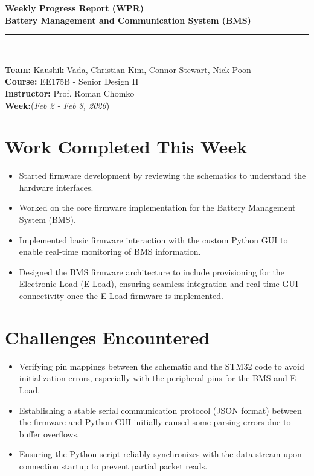 \documentclass[12pt]{article}
\begin{document}
\begin{center}
    {\Large \textbf{Weekly Progress Report (WPR)}} \\[6pt]
    {\large \textbf{Battery Management and Communication System (BMS)}} \\[2pt]
    \rule{0.8\textwidth}{0.5pt} \\[6pt]
\end{center}

\noindent
\textbf{Team:} Kaushik Vada, Christian Kim, Connor Stewart, Nick Poon \\[3pt]
\textbf{Course:} EE175B - Senior Design II \\
\textbf{Instructor:} Prof. Roman Chomko \\
\textbf{Week:}(\textit{Feb 2 - Feb 8, 2026}) \\[8pt]

\vspace{1em}

\section{Work Completed This Week}
\begin{itemize}[leftmargin=1cm]
    \item Started firmware development by reviewing the schematics to understand the hardware interfaces.
    \item Worked on the core firmware implementation for the Battery Management System (BMS).
    \item Implemented basic firmware interaction with the custom Python GUI to enable real-time monitoring of BMS information.
    \item Designed the BMS firmware architecture to include provisioning for the Electronic Load (E-Load), ensuring seamless integration and real-time GUI connectivity once the E-Load firmware is implemented.
\end{itemize}

\vspace{1em}

\section{Challenges Encountered}
\begin{itemize}[leftmargin=1cm]
    \item Verifying pin mappings between the schematic and the STM32 code to avoid initialization errors, especially with the peripheral pins for the BMS and E-Load.
    \item Establishing a stable serial communication protocol (JSON format) between the firmware and Python GUI initially caused some parsing errors due to buffer overflows.
    \item Ensuring the Python script reliably synchronizes with the data stream upon connection startup to prevent partial packet reads.
\end{itemize}
\end{document}
